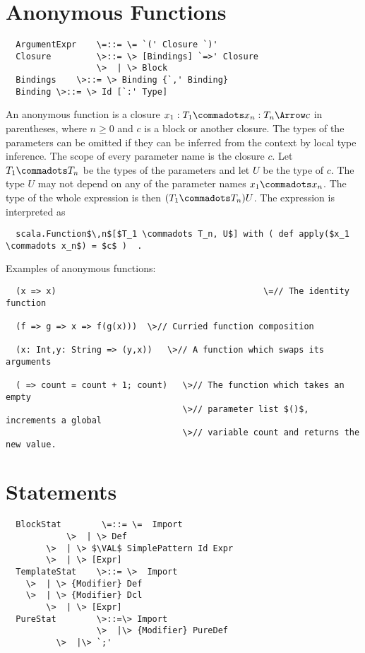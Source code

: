 \documentclass[11pt]{report}
\begin{document}
\section{Anonymous Functions}
\label{sec:closures}

\syntax\begin{verbatim}
  ArgumentExpr    \=::= \= `(' Closure `)'
  Closure         \>::= \> [Bindings] `=>' Closure
                  \>  | \> Block
  Bindings	  \>::= \> Binding {`,' Binding}
  Binding \>::= \> Id [`:' Type]
\end{verbatim}

An anonymous function is a closure $x_1: T_1 \commadots x_n: T_n
\Arrow c$ in parentheses, where $n \geq 0$ and $c$ is a block or another closure.
The types of the parameters can be omitted if they can be inferred
from the context by local type inference.  The scope of every
parameter name is the closure $c$. Let $T_1
\commadots T_n$ be the types of the parameters and let $U$ be the type
of $c$. The type $U$ may not depend on any of the parameter
names $x_1 \commadots x_n$. The type of the whole expression is then
$(T_1 \commadots T_n) U$. The expression is interpreted as
\begin{verbatim}
  scala.Function$\,n$[$T_1 \commadots T_n, U$] with ( def apply($x_1 \commadots x_n$) = $c$ )  .
\end{verbatim}

\example Examples of anonymous functions:

\begin{verbatim}
  (x => x)                                         \=// The identity function

  (f => g => x => f(g(x)))	\>// Curried function composition

  (x: Int,y: String => (y,x))   \>// A function which swaps its arguments

  ( => count = count + 1; count)   \>// The function which takes an empty
                                   \>// parameter list $()$, increments a global
                                   \>// variable count and returns the new value.
\end{verbatim}

\section{Statements}
\label{sec:statements}

\syntax\begin{verbatim}
  BlockStat        \=::= \=  Import
            \>  | \> Def
	    \>  | \> $\VAL$ SimplePattern Id Expr
	    \>  | \> [Expr]
  TemplateStat    \>::= \>  Import
	\>  | \> {Modifier} Def
	\>  | \> {Modifier} Dcl
        \>  | \> [Expr]
  PureStat        \>::=\> Import
                  \>  |\> {Modifier} PureDef
		  \>  |\> `;'
\end{verbatim}
\end{document}
